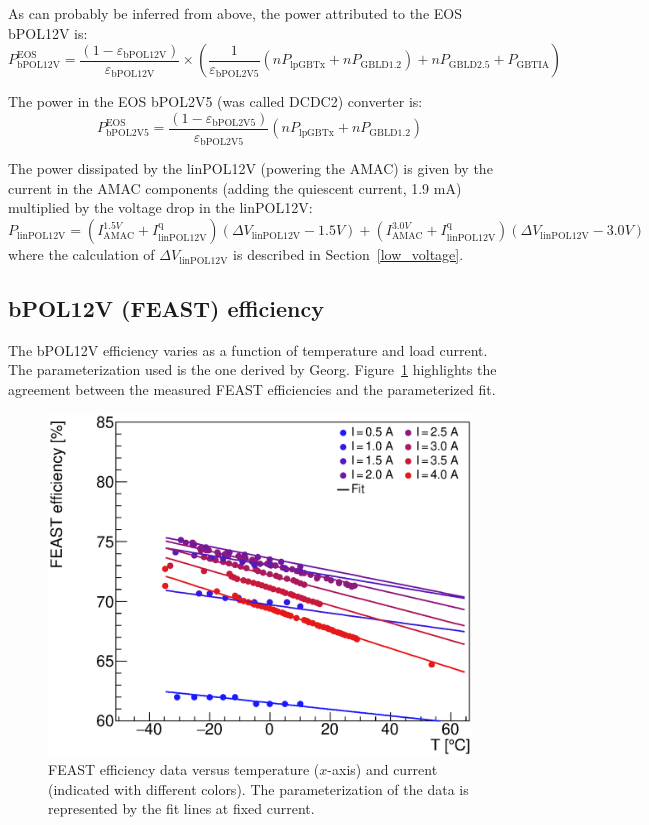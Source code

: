 As can probably be inferred from above, the power attributed to the EOS bPOL12V is:
\begin{equation}
P^\text{EOS}_\text{bPOL12V} = \frac{(1-\varepsilon_\text{bPOL12V})}{\varepsilon_\text{bPOL12V}}\times
  \left( \frac{1}{\varepsilon_\text{bPOL2V5}} (n P_\text{lpGBTx} + n P_\text{GBLD1.2}) + n P_\text{GBLD2.5} + P_\text{GBTIA} \right)
\end{equation}

The power in the EOS bPOL2V5 (was called DCDC2) converter is:
\begin{equation}
P^\text{EOS}_\text{bPOL2V5} = \frac{(1-\varepsilon_\text{bPOL2V5})}{\varepsilon_\text{bPOL2V5}} \left(n P_\text{lpGBTx} + n P_\text{GBLD1.2}\right)
\end{equation}


The power dissipated by the linPOL12V (powering the AMAC) is given by the current in the AMAC components
(adding the quiescent current, 1.9 mA) multiplied by the voltage drop in the linPOL12V:
\begin{equation}
P_\text{linPOL12V} = (I^{1.5V}_\text{AMAC} + I^\text{q}_\text{linPOL12V})\left(  \Delta V_\text{linPOL12V} - 1.5V \right)
                   + (I^{3.0V}_\text{AMAC} + I^\text{q}_\text{linPOL12V})\left(  \Delta V_\text{linPOL12V} - 3.0V \right)
\label{eq:amac_regulator}
\end{equation}
where the calculation of $\Delta V_\text{linPOL12V}$ is described in Section~\ref{low_voltage}.

\subsection{bPOL12V (FEAST) efficiency}

The bPOL12V efficiency varies as a function of temperature and load current. The parameterization used
is the one derived by Georg. Figure~\ref{feast_vs_temperature} highlights the agreement between the
measured FEAST efficiencies and the parameterized fit.

\begin{figure}[ht!]
\begin{center}
\includegraphics[width=0.49\linewidth]{figures/FeastEfficiency_isoCurrent}
\end{center}
\caption{FEAST efficiency data versus temperature ($x$-axis) and current (indicated with different
colors). The parameterization of the data is represented by the fit lines at fixed current.
}
\label{feast_vs_temperature}
\end{figure}

